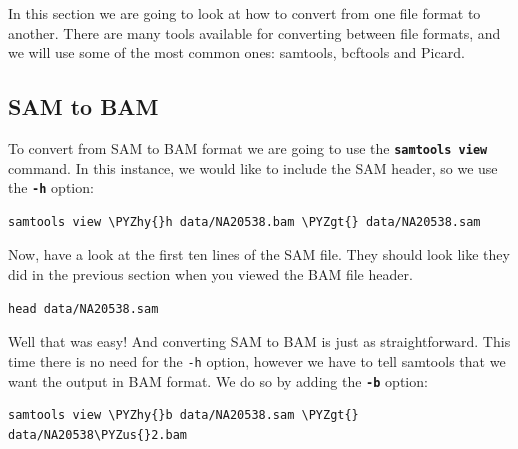 \documentclass[11pt]{article}
\makeatletter
\def\PYZus{\char`\_}
\def\PYZgt{\char`\>}
\def\PYZhy{\char`\-}
\newcommand{\boxspacing}{\kern\kvtcb@left@rule\kern\kvtcb@boxsep}
\newcommand{\prompt}[4]{
        \ttfamily\llap{{\color{#2}\LARGE\faKeyboardO\hspace{3pt}#4}}\vspace{-\baselineskip}
    }
\makeatother
\begin{document}
In this section we are going to look at how to convert from one file
format to another. There are many tools available for converting between
file formats, and we will use some of the most common ones: samtools,
bcftools and Picard.

\hypertarget{sam-to-bam}{%
\subsection{SAM to BAM}\label{sam-to-bam}}

To convert from SAM to BAM format we are going to use the
\textbf{\texttt{samtools\ view}} command. In this instance, we would
like to include the SAM header, so we use the \textbf{\texttt{-h}}
option:

    \begin{tcolorbox}[breakable, size=fbox, boxrule=1pt, pad at break*=1mm,colback=cellbackground, colframe=cellborder]
\prompt{In}{incolor}{ }{\boxspacing}
\begin{Verbatim}[commandchars=\\\{\}]
samtools view \PYZhy{}h data/NA20538.bam \PYZgt{} data/NA20538.sam
\end{Verbatim}
\end{tcolorbox}

    Now, have a look at the first ten lines of the SAM file. They should
look like they did in the previous section when you viewed the BAM file
header.

    \begin{tcolorbox}[breakable, size=fbox, boxrule=1pt, pad at break*=1mm,colback=cellbackground, colframe=cellborder]
\prompt{In}{incolor}{ }{\boxspacing}
\begin{Verbatim}[commandchars=\\\{\}]
head data/NA20538.sam
\end{Verbatim}
\end{tcolorbox}

    Well that was easy! And converting SAM to BAM is just as
straightforward. This time there is no need for the \texttt{-h} option,
however we have to tell samtools that we want the output in BAM format.
We do so by adding the \textbf{\texttt{-b}} option:

    \begin{tcolorbox}[breakable, size=fbox, boxrule=1pt, pad at break*=1mm,colback=cellbackground, colframe=cellborder]
\prompt{In}{incolor}{ }{\boxspacing}
\begin{Verbatim}[commandchars=\\\{\}]
samtools view \PYZhy{}b data/NA20538.sam \PYZgt{} data/NA20538\PYZus{}2.bam
\end{Verbatim}
\end{tcolorbox}
\end{document}
